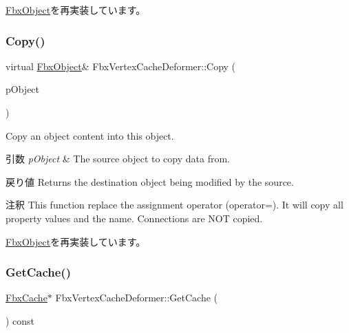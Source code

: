 \hyperlink{class_fbx_object_ad44f814323dc1b5e78bff1bfc608b4bb}{Fbx\+Object}を再実装しています。

\mbox{\label{class_fbx_vertex_cache_deformer_add616b06af35726e53255d46a301aeb0}} 
\subsubsection{\texorpdfstring{Copy()}{Copy()}}
{\footnotesize\ttfamily virtual \hyperlink{class_fbx_object}{Fbx\+Object}\& Fbx\+Vertex\+Cache\+Deformer\+::\+Copy (\begin{DoxyParamCaption}\item[{const \hyperlink{class_fbx_object}{Fbx\+Object} \&}]{p\+Object }\end{DoxyParamCaption})\hspace{0.3cm}{\ttfamily [virtual]}}

Copy an object content into this object. 
\begin{DoxyParams}{引数}
{\em p\+Object} & The source object to copy data from. \\
\hline
\end{DoxyParams}
\begin{DoxyReturn}{戻り値}
Returns the destination object being modified by the source. 
\end{DoxyReturn}
\begin{DoxyRemark}{注釈}
This function replace the assignment operator (operator=). It will copy all property values and the name. Connections are N\+OT copied. 
\end{DoxyRemark}


\hyperlink{class_fbx_object_a0c0c5adb38284d14bb82c04d54504a3e}{Fbx\+Object}を再実装しています。

\mbox{\label{class_fbx_vertex_cache_deformer_aa0888a4d84be4b936407daa3f5a1748b}} 
\subsubsection{\texorpdfstring{Get\+Cache()}{GetCache()}}
{\footnotesize\ttfamily \hyperlink{class_fbx_cache}{Fbx\+Cache}$\ast$ Fbx\+Vertex\+Cache\+Deformer\+::\+Get\+Cache (\begin{DoxyParamCaption}{ }\end{DoxyParamCaption}) const}

